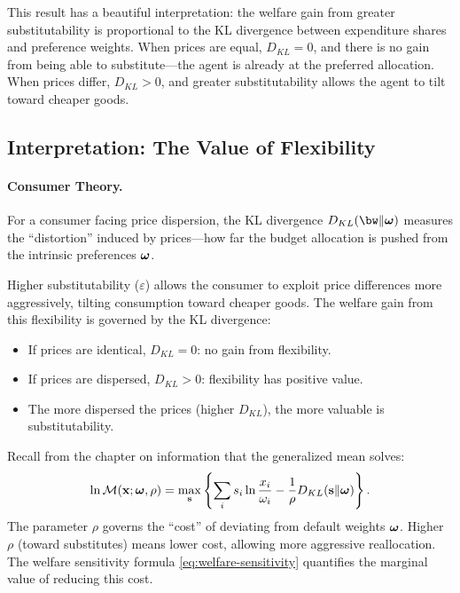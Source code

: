 This result has a beautiful interpretation: the welfare gain from greater substitutability is proportional to the KL divergence between expenditure shares and preference weights. When prices are equal, $D_{KL} = 0$, and there is no gain from being able to substitute---the agent is already at the preferred allocation. When prices differ, $D_{KL} > 0$, and greater substitutability allows the agent to tilt toward cheaper goods.

\subsection{Interpretation: The Value of Flexibility}
\label{subsec:flexibility}

\paragraph{Consumer Theory.}

For a consumer facing price dispersion, the KL divergence $D_{KL}(\bw \| \bom)$ measures the ``distortion'' induced by prices---how far the budget allocation is pushed from the intrinsic preferences $\boldsymbol{\omega}$.

Higher substitutability ($\varepsilon$) allows the consumer to exploit price differences more aggressively, tilting consumption toward cheaper goods. The welfare gain from this flexibility is governed by the KL divergence:
\begin{itemize}[nosep]
    \item If prices are identical, $D_{KL} = 0$: no gain from flexibility.
    \item If prices are dispersed, $D_{KL} > 0$: flexibility has positive value.
    \item The more dispersed the prices (higher $D_{KL}$), the more valuable is substitutability.
\end{itemize}

\begin{calloutnote}
Recall from the chapter on information that the generalized mean solves:
\begin{equation}
\ln \mathcal{M}(\mathbf{x}; \boldsymbol{\omega}, \rho) = \max_{\mathbf{s}} \left\{ \sum_i s_i \ln \frac{x_i}{\omega_i} - \frac{1}{\rho} D_{KL}(\mathbf{s} \| \boldsymbol{\omega}) \right\}.
\end{equation}
The parameter $\rho$ governs the ``cost'' of deviating from default weights $\boldsymbol{\omega}$. Higher $\rho$ (toward substitutes) means lower cost, allowing more aggressive reallocation. The welfare sensitivity formula \eqref{eq:welfare-sensitivity} quantifies the marginal value of reducing this cost.
\end{calloutnote}

